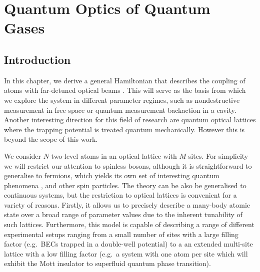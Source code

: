 
\chapter{Quantum Optics of Quantum Gases}  

\ifpdf
    \graphicspath{{Chapter2/Figs/Raster/}{Chapter2/Figs/PDF/}{Chapter2/Figs/}}
\else
    \graphicspath{{Chapter2/Figs/Vector/}{Chapter2/Figs/}}
\fi

\section{Introduction}

In this chapter, we derive a general Hamiltonian that describes the
coupling of atoms with far-detuned optical beams
\cite{mekhov2012}. This will serve as the basis from which we explore
the system in different parameter regimes, such as nondestructive
measurement in free space or quantum measurement backaction in a
cavity. Another interesting direction for this field of research are
quantum optical lattices where the trapping potential is treated
quantum mechanically. However this is beyond the scope of this work.


We consider $N$ two-level atoms in an optical lattice with $M$
sites. For simplicity we will restrict our attention to spinless
bosons, although it is straightforward to generalise to fermions,
which yields its own set of interesting quantum phenomena
\cite{atoms2015, mazzucchi2016, mazzucchi2016af}, and other spin
particles. The theory can be also be generalised to continuous
systems, but the restriction to optical lattices is convenient for a
variety of reasons. Firstly, it allows us to precisely describe a
many-body atomic state over a broad range of parameter values due to
the inherent tunability of such lattices. Furthermore, this model is
capable of describing a range of different experimental setups ranging
from a small number of sites with a large filling factor (e.g.~BECs
trapped in a double-well potential) to a an extended multi-site
lattice with a low filling factor (e.g.~a system with one atom per
site which will exhibit the Mott insulator to superfluid quantum phase
transition). 

